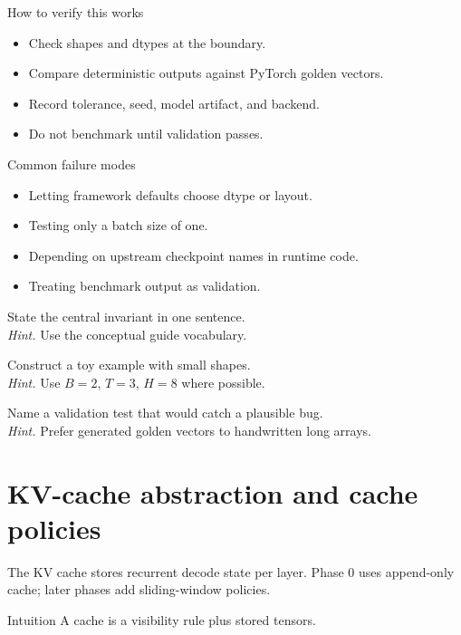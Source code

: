 \begin{verificationbox}{How to verify this works}
\begin{itemize}
\item Check shapes and dtypes at the boundary.
\item Compare deterministic outputs against PyTorch golden vectors.
\item Record tolerance, seed, model artifact, and backend.
\item Do not benchmark until validation passes.
\end{itemize}
\end{verificationbox}

\begin{warningbox}{Common failure modes}
\begin{itemize}
\item Letting framework defaults choose dtype or layout.
\item Testing only a batch size of one.
\item Depending on upstream checkpoint names in runtime code.
\item Treating benchmark output as validation.
\end{itemize}
\end{warningbox}

\begin{chapterexercises}
\item State the central invariant in one sentence.\\
\textit{Hint.} Use the conceptual guide vocabulary.
\item Construct a toy example with small shapes.\\
\textit{Hint.} Use $B=2$, $T=3$, $H=8$ where possible.
\item Name a validation test that would catch a plausible bug.\\
\textit{Hint.} Prefer generated golden vectors to handwritten long arrays.
\end{chapterexercises}

\chapter{KV-cache abstraction and cache policies}
\label{ch:kv-cache}
The KV cache stores recurrent decode state per layer. Phase 0 uses append-only cache; later phases add sliding-window policies.



\begin{intuitionbox}{Intuition}
A cache is a visibility rule plus stored tensors.
\end{intuitionbox}

